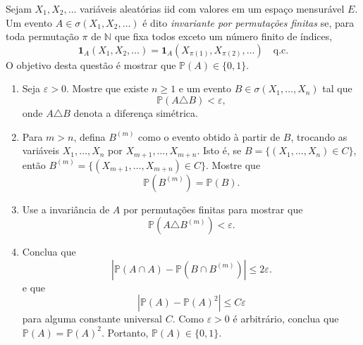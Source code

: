 \begin{exercise}
Sejam \(X_1,X_2,\dots\) variáveis aleatórias iid com valores em um espaço mensurável \(E\).
Um evento \(A\in\sigma(X_1,X_2,\dots)\) é dito \emph{invariante por permutações finitas} se, para toda permutação \(\pi\) de \(\mathbb N\) que fixa todos exceto um número finito de índices,
\[
\mathbf 1_A(X_1,X_2,\dots)
=
\mathbf 1_A(X_{\pi(1)},X_{\pi(2)},\dots)
\quad \text{q.c.}
\]
O objetivo desta questão é mostrar que $\mathbb P(A)\in\{0,1\}$.

\begin{enumerate}[\quad a)]
    \item Seja \(\varepsilon>0\). Mostre que existe \(n\ge1\) e um evento $B\in\sigma(X_1,\dots,X_n)$ tal que
    \[
    \mathbb P(A\triangle B)<\varepsilon,
    \]
    onde \(A\triangle B\) denota a diferença simétrica.

    \item Para \(m>n\), defina \(B^{(m)}\) como o evento obtido à partir de \(B\), trocando as variáveis $X_1,\dots,X_n$ por $X_{m+1},\dots,X_{m+n}$.
    Isto é, se $B=\{(X_1,\dots,X_n)\in C\}$, então $B^{(m)}=\{(X_{m+1},\dots,X_{m+n})\in C\}$.
    Mostre que
    \[
    \mathbb P(B^{(m)})=\mathbb P(B).
    \]

    \item Use a invariância de \(A\) por permutações finitas para mostrar que
    \[
    \mathbb P(A\triangle B^{(m)})<\varepsilon.
    \]

    \item Conclua que
    \[
    |\mathbb P(A\cap A)-\mathbb P(B\cap B^{(m)})|
    \le 2\varepsilon.
  \]
  e que
    \[
    |\mathbb P(A)-\mathbb P(A)^2|
    \le C\varepsilon
    \]
    para alguma constante universal \(C\).
    Como \(\varepsilon>0\) é arbitrário, conclua que $\mathbb P(A)=\mathbb P(A)^2$.
    Portanto, $\mathbb P(A)\in\{0,1\}$.
\end{enumerate}
\end{exercise}


